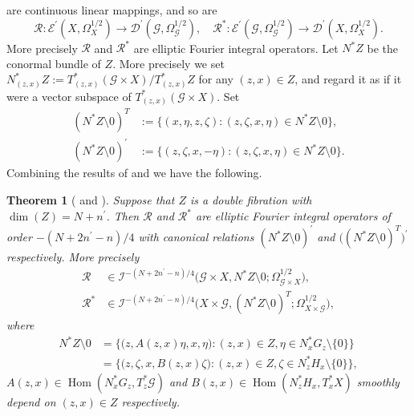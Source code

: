 \documentclass[a4paper,11pt,reqno]{amsart}
\newtheorem{theorem}{Theorem}%
\theoremstyle{definition}
\theoremstyle{remark}
\begin{document}
%
%
are continuous linear mappings, and so are  
%
%
$$
\mathcal{R}:\mathscr{E}^\prime(X,\Omega_X^{1/2}) \rightarrow \mathscr{D}^\prime(\mathcal{G},\Omega_\mathcal{G}^{1/2}), 
\quad
\mathcal{R}^\ast:\mathscr{E}^\prime(\mathcal{G},\Omega_\mathcal{G}^{1/2}) \rightarrow \mathscr{D}^\prime(X,\Omega_X^{1/2}).
$$
%
%
More precisely $\mathcal{R}$ and $\mathcal{R}^\ast$ are elliptic Fourier integral operators. 
Let $N^\ast{Z}$ be the conormal bundle of $Z$. 
More precisely we set 
$N^\ast_{(z,x)}{Z}:=T^\ast_{(z,x)}(\mathcal{G}{\times}X)/T^\ast_{(z,x)}{Z}$ 
for any $(z,x) \in Z$, 
and regard it as if it were a vector subspace of $T^\ast_{(z,x)}(\mathcal{G}{\times}X)$. 
Set 
%
%
\begin{align*}
  (N^\ast{Z}\setminus0)^T
& :=
  \{(x,\eta,z,\zeta) : (z,\zeta,x,\eta) \in N^\ast{Z}\setminus0\}, 
\\
  (N^\ast{Z}\setminus0)^\prime
& :=
  \{(z,\zeta,x,-\eta) : (z,\zeta,x,\eta) \in N^\ast{Z}\setminus0\}. 
\end{align*}
%
%
Combining the results of \cite{MazzucchelliSaloTzou} and \cite{Hoermander4} we have the following. 
%
%
\begin{theorem}[{\cite[Theorem~2.2]{MazzucchelliSaloTzou} and \cite[Theorem~25.2.2]{Hoermander4}}]
\label{theorem:fios}
Suppose that $Z$ is a double fibration with $\dim(Z)=N+n^\prime$. 
Then $\mathcal{R}$ and $\mathcal{R}^\ast$ are elliptic Fourier integral operators of order $-(N+2n^\prime-n)/4$ with canonical relations $(N^\ast{Z}\setminus0)^\prime$ 
and $\bigl((N^\ast{Z}\setminus0)^T\bigr)^\prime$ respectively. 
More precisely  
%
%
\begin{align*}
  \mathcal{R}
& \in 
  \mathcal{I}^{-(N+2n^\prime-n)/4}
  \bigl(\mathcal{G}{\times}X,N^\ast{Z}\setminus0;\Omega_{\mathcal{G}{\times}X}^{1/2}\bigr),
\\
  \mathcal{R}^\ast
& \in 
  \mathcal{I}^{-(N+2n^\prime-n)/4}
  \bigl(X\times\mathcal{G},(N^\ast{Z}\setminus0)^T;\Omega_{X\times\mathcal{G}}^{1/2}\bigr), 
\end{align*}
%
%
where 
%
%
\begin{align*}
  N^\ast{Z}\setminus0 
& =
  \bigl\{
  \bigl(z,A(z,x)\eta,x,\eta\bigr) : 
  (z,x) \in Z, \eta \in N^\ast_xG_z\setminus\{0\}
  \bigr\}
\\
& =
  \bigl\{
  \bigl(z,\zeta,x,B(z,x)\zeta\bigr) : 
  (z,x) \in Z, \zeta \in N^\ast_zH_x\setminus\{0\}
  \bigr\},
\end{align*}
%
%
$A(z,x) \in \operatorname{Hom}(N^\ast_xG_z,T^\ast_z\mathcal{G})$ 
and 
$B(z,x) \in \operatorname{Hom}(N^\ast_zH_x,T^\ast_xX)$ 
smoothly depend on $(z,x) \in Z$ respectively. 
%
%
\end{theorem}
\end{document}
